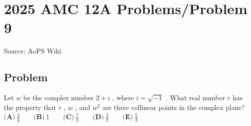 \documentclass[12pt]{article}
\begin{document}
\section*{{2025 AMC 12A Problems/Problem 9}}
Source: AoPS Wiki

\subsection*{Problem}
Let $w$ be the complex number $2+i$ , where $i=\sqrt{-1}$ . What real number $r$ has the property that $r$ , $w$ , and $w^2$ are three collinear points in the complex plane? $\textbf{(A)}~\frac34\qquad\textbf{(B)}~1\qquad\textbf{(C)}~\frac75\qquad\textbf{(D)}~\frac32\qquad\textbf{(E)}~\frac53$
\end{document}
